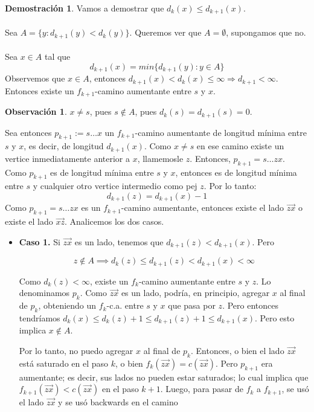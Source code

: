 \documentclass[11pt, a4paper]{article}
\theoremstyle{definition}
\newtheorem*{demostracion}{Demostración}
\newtheorem*{remark}{Observación}
\begin{document}
\begin{demostracion}
    Vamos a demostrar que $d_k(x) \leq d_{k+1}(x)$.\\ \\
    Sea $A=\{y: d_{k+1}(y)<d_k(y)\}$. Queremos ver que $A=\emptyset$, supongamos que no.\\ \\
    Sea $x \in A$ tal que
    \begin{equation}
        d_{k+1}(x)=min\{d_{k+1}(y): y \in A\}
    \end{equation}
    Observemos que $x \in A$, entonces $d_{k+1}(x)<d_k(x) \leq \infty  \Rightarrow d_{k+1} < \infty$. Entonces existe un $f_{k+1}$-camino aumentante
    entre $s$ y $x$. 
    \begin{remark}
        $x \neq s$, pues $s\notin A$, pues $d_k(s)=d_{k+1}(s)=0$.
    \end{remark}
    Sea entonces $p_{k+1}:=s \ldots x$ un $f_{k+1}$-camino aumentante de longitud mínima entre $s$ y $x$, es decir, de longitud $d_{k+1}(x)$. Como 
    $x\neq s$ en ese camino existe un vertice inmediatamente anterior a $x$, llamemosle $z$. Entonces, $p_{k+1}=s \ldots zx$.\\
    Como $p_{k+1}$ es de longitud mínima entre $s$ y $x$, entonces es de longitud mínima entre $s$ y cualquier otro vertice intermedio como pej $z$. Por 
    lo tanto:
    \begin{equation}
        d_{k+1}(z)=d_{k+1}(x)-1
    \end{equation}
    Como $p_{k+1} = s \ldots zx$ es un $f_{k+1}$-camino aumentante, entonces existe el lado $\overrightarrow{zx}$ o existe el lado 
    $\overrightarrow{xz}$. Analicemos los dos casos.
    \begin{itemize}
        \item \textbf{Caso 1.} Si $\overrightarrow{zx}$ es un lado, tenemos que $d_{k+1}(z) < d_{k+1}(x)$. Pero
         
        \[ z \notin A \implies d_k(z) \leq d_{k+1}(z) < d_{k+1}(x) < \infty \]
        
        Como $d_k(z) < \infty$, existe un $f_k$-camino aumentante entre $s$ y $z$. 
        Lo denominamos $p_k$. Como $\overrightarrow{zx}$ es un lado, podría, en principio, agregar $x$ al final de $p_k$, 
        obteniendo un $f_k$-c.a. entre $s$ y $x$ que pasa por $z$. Pero entonces tendríamos 
        $d_k(x) \leq d_k(z) + 1 \leq d_{k+1}(z) + 1 \leq d_{k+1}(x)$. 
        Pero esto implica $x \notin A$. 
        
        Por lo tanto, no puedo agregar $x$ al final de $p_k$. 
        Entonces, o bien el lado $\overrightarrow{zx}$ está saturado en el paso $k$, o bien $f_k(\overrightarrow{zx}) = c(\overrightarrow{zx})$. 
        Pero $p_{k+1}$ era aumentante; es decir, sus lados no pueden estar saturados; 
        lo cual implica que $f_{k+1}(\overrightarrow{zx}) < c(\overrightarrow{zx})$ en el paso $k + 1$. 
        Luego, para pasar de $f_k$ a $f_{k+1}$, se usó el lado $\overrightarrow{zx}$ y se usó backwards en el camino
        

\end{itemize}
\end{demostracion}
\end{document}
